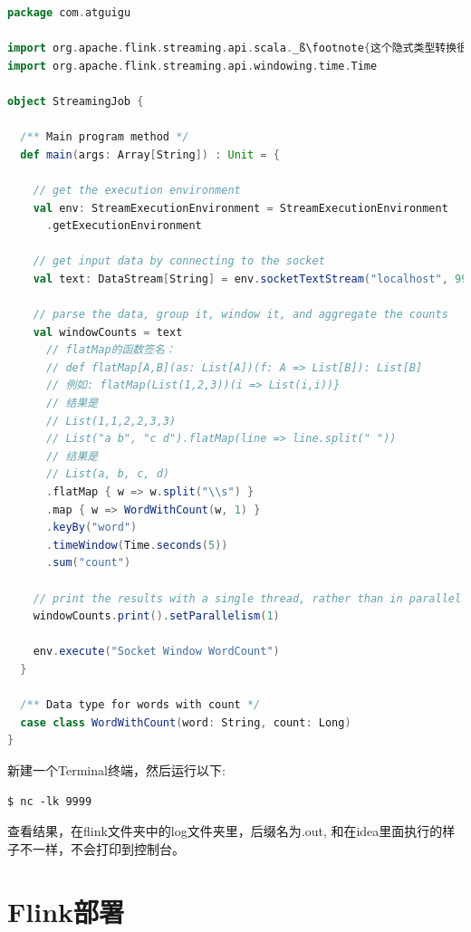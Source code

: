 \documentclass[oneside]{ctexbook}
\begin{document}
\begin{lstlisting}[language=scala, caption=StreamingJob.scala, escapechar=ß]
package com.atguigu

import org.apache.flink.streaming.api.scala._ß\footnote{这个隐式类型转换很重要，不能丢}ß // 隐式类型转换
import org.apache.flink.streaming.api.windowing.time.Time

object StreamingJob {

  /** Main program method */
  def main(args: Array[String]) : Unit = {

    // get the execution environment
    val env: StreamExecutionEnvironment = StreamExecutionEnvironment
      .getExecutionEnvironment

    // get input data by connecting to the socket
    val text: DataStream[String] = env.socketTextStream("localhost", 9999, '\n')

    // parse the data, group it, window it, and aggregate the counts
    val windowCounts = text
      // flatMap的函数签名：
      // def flatMap[A,B](as: List[A])(f: A => List[B]): List[B]
      // 例如: flatMap(List(1,2,3))(i => List(i,i))}
      // 结果是
      // List(1,1,2,2,3,3)
      // List("a b", "c d").flatMap(line => line.split(" "))
      // 结果是
      // List(a, b, c, d)
      .flatMap { w => w.split("\\s") }
      .map { w => WordWithCount(w, 1) }
      .keyBy("word")
      .timeWindow(Time.seconds(5))
      .sum("count")

    // print the results with a single thread, rather than in parallel
    windowCounts.print().setParallelism(1)

    env.execute("Socket Window WordCount")
  }

  /** Data type for words with count */
  case class WordWithCount(word: String, count: Long)
}
\end{lstlisting}

新建一个Terminal终端，然后运行以下:

\begin{lstlisting}
$ nc -lk 9999
\end{lstlisting}

查看结果，在flink文件夹中的log文件夹里，后缀名为\colorbox{gray!20}{.out}, 和在idea里面执行的样子不一样，不会打印到控制台。 

\section{Flink部署}
\end{document}
